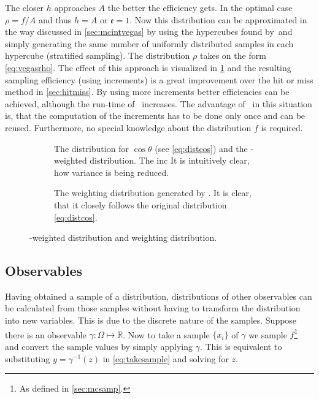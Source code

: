 The closer \(h\) approaches \(A\) the better the efficiency gets. In
the optimal case \(\rho=f/A\) and thus \(h=A\) or
\(\mathfrak{e} = 1\). Now this distribution can be approximated in the
way discussed in \cref{sec:mcintvegas} by using the hypercubes found
by~\vegas and simply generating the same number of uniformly
distributed samples in each hypercube (stratified sampling). The
distribution \(\rho\) takes on the form \cref{eq:vegasrho}. The
effect of this approach is visualized in \cref{fig:vegasdist} and the
resulting sampling efficiency  (using
 increments) is a great
improvement over the hit or miss method in \cref{sec:hitmiss}. By using
more increments better efficiencies can be achieved, although the
run-time of \vegas\ increases. The advantage of \vegas\ in this
situation is, that the computation of the increments has to be done
only once and can be reused. Furthermore, no special knowledge about
the distribution \(f\) is required.

\begin{figure}[ht]
  \centering
  \begin{subfigure}{.49\textwidth}
    \caption[The distribution for \(\cos\theta\), derived from the
    differential cross-section and the \vegas-weighted
    distribution]{\label{fig:vegasdist} The distribution for
      \(\cos\theta\) (see \cref{eq:distcos}) and the \vegas-weighted
      distribution. The inc It is intuitively clear, how variance is
      being reduced.}
  \end{subfigure}
  \begin{subfigure}{.49\textwidth}
    \caption[The weighting distribution generated by
    \vegas.]{\label{fig:vegasrho} The weighting distribution generated
      by \vegas. It is clear, that it closely follows the original
      distribution \cref{eq:distcos}.}
  \end{subfigure}
  \caption{\label{fig:vegas-weighting} \vegas-weighted distribution
    and weighting distribution.}
\end{figure}

\subsection{Observables}%
\label{sec:obs}

Having obtained a sample of a distribution, distributions of other
observables can be calculated from those samples without having to
transform the distribution into new variables. This is due to the
discrete nature of the samples. Suppose there is an observable
\(\gamma\colon\Omega\mapsto\mathbb{R}\). Now to take a sample
\(\{x_i\}\) of \(\gamma\) we sample \(f\)\footnote{As defined
  in \cref{sec:mcsamp}.} and convert the sample values by simply
applying \(\gamma\). This is equivalent to
substituting \(y=\gamma^{-1}(z)\) in \cref{eq:takesample} and solving
for \(z\).

